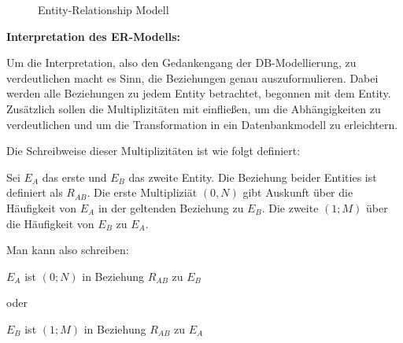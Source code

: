 \documentclass[12pt, twoside, a4paper, ngerman]{article}
\begin{document}
\begin{center}
\begin{figure}[H]
{
}
\caption[\textbf{Entity-Relationship Modell}]{Entity-Relationship Modell}
\label{fig:ERModell}
\end{figure}
\end{center}

\textbf{Interpretation des \ac{ER-Modell}s:}

Um die Interpretation, also den Gedankengang der \ac{DB}-Modellierung, zu verdeutlichen macht es Sinn, die Beziehungen genau auszuformulieren.
Dabei werden alle Beziehungen zu jedem Entity betrachtet, begonnen mit dem Entity.
Zusätzlich sollen die Multiplizitäten mit einfließen, um die Abhängigkeiten zu verdeutlichen und um die Transformation in ein Datenbankmodell zu erleichtern.

Die Schreibweise dieser Multiplizitäten ist wie folgt definiert:

Sei $E_{A}$ das erste und $E_{B}$ das zweite Entity.
Die Beziehung beider Entities ist definiert als $R_{AB}$. 
Die erste Multipliziät $(0,N)$ gibt Auskunft über die Häufigkeit von $E_{A}$ in der geltenden Beziehung zu $E_{B}$.
Die zweite $(1;M)$ über die Häufigkeit von $E_{B}$ zu $E_{A}$.

Man kann also schreiben:

\begin{center}
$E_{A}$ ist $(0;N)$ in Beziehung $R_{AB}$ zu $E_{B}$

oder

$E_{B}$ ist $(1;M)$ in Beziehung $R_{AB}$ zu $E_{A}$
\end{center}
\end{document}
